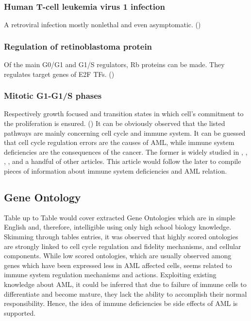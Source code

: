 \documentclass[3p,authoryear,preprint,12pt]{elsarticle}
\begin{document}
\subsubsection{Human T-cell leukemia virus 1 infection}
A retroviral infection mostly nonlethal and even asymptomatic. (\cite{TCLv1})

\subsubsection{Regulation of retinoblastoma protein}
Of the main G0/G1 and G1/S regulators, Rb proteins can be made. They regulates target genes of E2F TFs. (\cite{Hume2009})

\subsubsection{Mitotic G1-G1/S phases}
Respectively growth focused and transition states in which cell's commitment to the proliferation is ensured. (\cite{Bertoli2013})
\newline \newline
It can be obviously observed that the listed pathways are mainly concerning cell cycle and immune system. It can be guessed that cell cycle regulation errors are the causes of AML, while immune system deficiencies are the consequences of the cancer. The former is widely studied in \cite{Saito2010}, \cite{Stiehl940}, \cite{BANKER1998221}, \cite{Schnerch2012}, and a handful of other articles. This article would follow the later to compile pieces of information about immune system deficiencies and AML relation.

\subsection{Gene Ontology}
Table %
up to Table %
would cover extracted Gene Ontologies which are in simple English and, therefore, intelligible using only high school biology knowledge.
Skimming through tables entries, it was observed that highly scored ontologies are strongly linked to cell cycle regulation and fidelity mechanisms, and cellular components. While low scored ontologies, which are usually observed among genes which have been expressed less in AML affected cells, seems related to immune system regulation mechanisms and actions. Exploiting existing knowledge about AML, it could be inferred that due to failure of immune cells to differentiate and become mature, they lack the ability to accomplish their normal responsibility. Hence, the idea of immune deficiencies be side effects of AML is supported.
\end{document}
